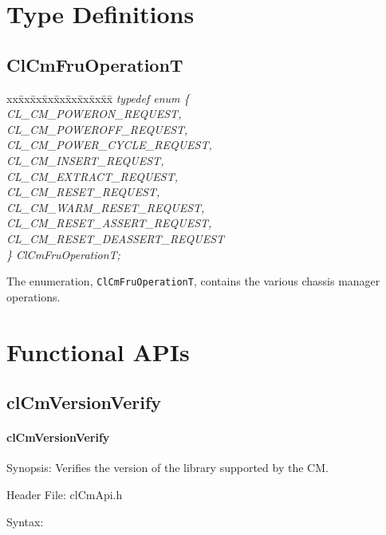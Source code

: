\begin{flushleft}
\section{Type Definitions}


\subsection{ClCmFruOperationT}
\begin{tabbing}
xx\=xx\=xx\=xx\=xx\=xx\=xx\=xx\=xx\=\kill
\textit{typedef enum \{}\\
\>\>\>\>\textit{CL\_CM\_POWERON\_REQUEST,}\\
\>\>\>\>\textit{CL\_CM\_POWEROFF\_REQUEST,}\\
\>\>\>\>\textit{CL\_CM\_POWER\_CYCLE\_REQUEST,}\\
\>\>\>\>\textit{CL\_CM\_INSERT\_REQUEST,}\\
\>\>\>\>\textit{CL\_CM\_EXTRACT\_REQUEST,}\\
\>\>\>\>\textit{CL\_CM\_RESET\_REQUEST,}\\
\>\>\>\>\textit{CL\_CM\_WARM\_RESET\_REQUEST,}\\
\>\>\>\>\textit{CL\_CM\_RESET\_ASSERT\_REQUEST,}\\
\>\>\>\>\textit{CL\_CM\_RESET\_DEASSERT\_REQUEST}\\
\textit{\} ClCmFruOperationT;}\end{tabbing}
The enumeration, {\tt{ClCmFruOperationT}}, contains the various chassis manager operations.


\newpage

\section{Functional APIs}


\subsection{clCmVersionVerify}
\hypertarget{pagecm202}{}\paragraph{cl\-Cm\-Version\-Verify}\label{pagecm202}
\begin{Desc}
\item[Synopsis:]Verifies the version of the library supported by the CM.\end{Desc}
\begin{Desc}
\item[Header File:]clCmApi.h\end{Desc}
\begin{Desc}
\item[Syntax:]


\end{Desc}
\end{flushleft}
